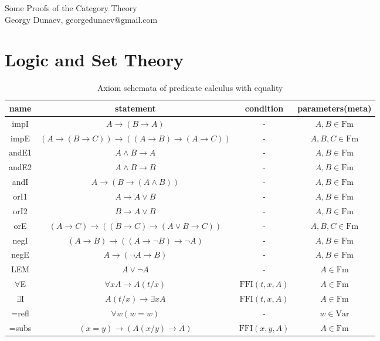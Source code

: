 \documentclass[10pt,a4paper]{article}
\begin{document}
Some Proofs of the Category Theory\\
Georgy Dunaev, georgedunaev@gmail.com\\
\section{Logic and Set Theory}
\begin{table}[H]
\centering
\caption{Axiom schemata of predicate calculus with equality}
\label{tab:axiompltab}
\begin{tabular}{|c|c|c|c|}
\hline
name & statement & condition & parameters(meta)\\ \hline
\hline
impI & $A \to (B \to A)$ & - & $A,B \in \textrm{Fm}$\\ %
impE & $(A \to (B \to C))\to((A\to B)\to(A\to C))$ & -& $A,B,C \in \textrm{Fm}$\\ \hline
\hline
andE1 & $A \land B \to A$& -& $A,B \in \textrm{Fm}$\\ %
andE2 & $A \land B \to B$& -& $A,B \in \textrm{Fm}$\\ %
andI & $A\to(B\to (A \land B))$& -& $A,B \in \textrm{Fm}$\\ \hline
\hline
orI1 & $A \to  A \lor B$& -& $A,B \in \textrm{Fm}$\\ %
orI2 & $B \to  A \lor B$& -& $A,B \in \textrm{Fm}$\\ %
orE & $(A \to  C)\to ((B \to  C) \to  (A \lor B \to  C))$& -& $A,B,C \in \textrm{Fm}$\\ \hline
\hline
negI & $(A \to  B) \to  ((A \to  \neg B) \to  \neg A)$& -& $A,B \in \textrm{Fm}$\\ %
negE & $A \to  (\neg A \to  B)$& -& $A,B \in \textrm{Fm}$\\ \hline
\hline
LEM & $A \lor \neg A$& -& $A \in \textrm{Fm}$\\ \hline
\hline
$\forall$E & $\forall xA\to A(t/x)$ & $\textrm{FFI}(t,x,A)$& $A \in \textrm{Fm}$\\ %
$\exists$I & $A(t/x)\to \exists x A$ & $\textrm{FFI}(t,x,A)$& $A \in \textrm{Fm}$\\ \hline
\hline
=refl&$\forall w (w=w)$&-& $w \in \textrm{Var}$\\
=subs&$(x=y)\to ( A(x/y)\to A) $&$\textrm{FFI}(x,y,A)$& $A \in \textrm{Fm}$\\\hline
\end{tabular}
\end{table}
\end{document}
